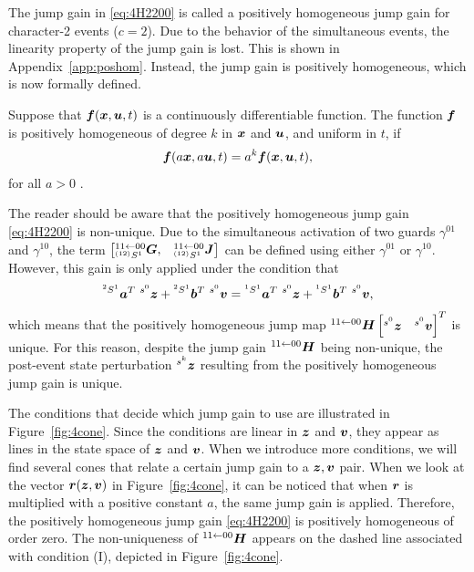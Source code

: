 \documentclass[../DC2017114Bouma.tex]{subfiles}
\begin{document}
The jump gain in \eqref{eq:4H2200} is called a positively homogeneous jump gain for character-2 events ($c=2$). Due to the behavior of the simultaneous events, the linearity property of the jump gain is lost. This is shown in Appendix~\ref{app:poshom}. Instead, the jump gain is positively homogeneous, which is now formally defined.
 
\begin{sloppypar}
\begin{mydef}
Suppose that ${\boldsymbol{f}}({\boldsymbol{x}},{\boldsymbol{u}},t)$ is a continuously differentiable function. The function ${\boldsymbol{f}}$ is positively homogeneous of degree $k$ in ${\boldsymbol{x}}$ and ${\boldsymbol{u}}$, and uniform in $t$, if 
\begin{align}
{\boldsymbol{f}}(a{\boldsymbol{x}},a{\boldsymbol{u}},t) = a^k{\boldsymbol{f}}({\boldsymbol{x}},{\boldsymbol{u}},t),
\end{align}
for all $a>0$ \textnormal{\cite{Apostol1967}}.
\end{mydef}
\end{sloppypar}

The reader should be aware that the positively homogeneous jump gain \eqref{eq:4H2200} is non-unique. Due to the simultaneous activation of two guards $\gamma^{01}$ and $\gamma^{10}$, the term $\begin{bmatrix}\hspace{0cm}^{11\leftarrow 00}_{\hspace{0cm}^{(12)}S^1}{\boldsymbol{G}}, & \hspace{0cm}^{11\leftarrow 00}_{\hspace{0cm}^{(12)}S^1}{\boldsymbol{J}}\end{bmatrix}$ can be defined using either $\gamma^{01}$ or $\gamma^{10}$. However, this gain is only applied under the condition that 
\begin{align}
\hspace{0cm}^{^2 S^1}{\boldsymbol{a}}^T\ \hspace{0cm}^{s^0}{\boldsymbol{z}} +\hspace{0cm}^{^2 S^1}{\boldsymbol{b}}^T\ \hspace{0cm}^{s^0}{\boldsymbol{v}} = \hspace{0cm}^{^1 S^1}{\boldsymbol{a}}^T\ \hspace{0cm}^{s^0}{\boldsymbol{z}} +\hspace{0cm}^{^1 S^1}{\boldsymbol{b}}^T\ \hspace{0cm}^{s^0}{\boldsymbol{v}},
\end{align}
which means that the positively homogeneous jump map $\hspace{0cm}^{11\leftarrow 00}{\boldsymbol{H}}\begin{bmatrix}\hspace{0cm}^{s^0}{\boldsymbol{z}} & \hspace{0cm}^{s^0}{\boldsymbol{v}} \end{bmatrix}^T$ is unique. For this reason, despite the jump gain $\hspace{0cm}^{11\leftarrow 00}{\boldsymbol{H}}$ being non-unique, the post-event state perturbation $\hspace{0cm}^{s^k}{\boldsymbol{z}}$ resulting from the positively homogeneous jump gain is unique. 

The conditions that decide which jump gain to use are illustrated in Figure~\ref{fig:4cone}. Since the conditions are linear in ${\boldsymbol{z}}$ and ${\boldsymbol{v}}$, they appear as lines in the state space of ${\boldsymbol{z}}$ and ${\boldsymbol{v}}$. When we introduce more conditions, we will find several cones that relate a certain jump gain to a ${\boldsymbol{z}},{\boldsymbol{v}}$ pair. When we look at the vector ${\boldsymbol{r}}({\boldsymbol{z}},{\boldsymbol{v}})$ in Figure~\ref{fig:4cone}, it can be noticed that when ${\boldsymbol{r}}$ is multiplied with a positive constant $a$, the same jump gain is applied. Therefore, the positively homogeneous jump gain \eqref{eq:4H2200} is positively homogeneous of order zero. The non-uniqueness of $\hspace{0cm}^{11\leftarrow 00}{\boldsymbol{H}}$ appears on the dashed line associated with condition (I), depicted in Figure~\ref{fig:4cone}.
\end{document}
